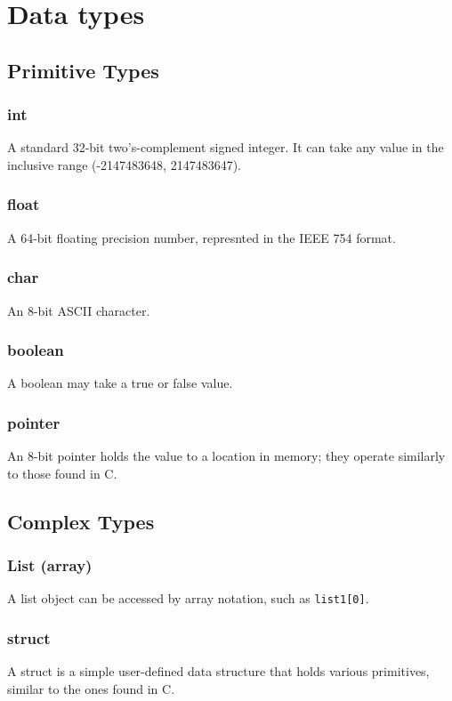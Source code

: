\chapter{Data types}
    \section{Primitive Types}
        \subsection{int}
            A standard 32-bit two's-complement signed integer. It can take any value in the inclusive range (-2147483648, 2147483647).
        \subsection{float}
            A 64-bit floating precision number, represnted in the IEEE 754 format.            
        \subsection{char}
            An 8-bit ASCII character.  
        \subsection{boolean}
            A boolean may take a true or false value. 
        \subsection{pointer}
            An 8-bit pointer holds the value to a location in memory; they operate similarly to those found in C.
    \section{Complex Types}
        \subsection{List (array)}
            A list object can be accessed by array notation, such as \texttt{list1[0]}. 
        \subsection{struct}
            A struct is a simple user-defined data structure that holds various primitives, similar to the ones found in C. 
